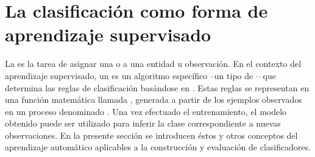 %
%
%
\section{La clasificación como forma de aprendizaje supervisado}
%
La  es la tarea de asignar una  o
 a una entidad u observación.
En el contexto del aprendizaje supervisado, un  es un
algoritmo específico --un tipo de -- que
determina las reglas de clasificación basándose en .
Estas reglas se representan en una función matemática llamada
, generada a partir de los ejemplos observados en un proceso
denominado .
Una vez efectuado el entrenamiento, el modelo obtenido puede ser
utilizado para inferir la clase correspondiente a nuevas
observaciones.
En la presente sección se introducen éstos y otros conceptos del
aprendizaje automático aplicables a la construcción y evaluación de
clasificadores.
